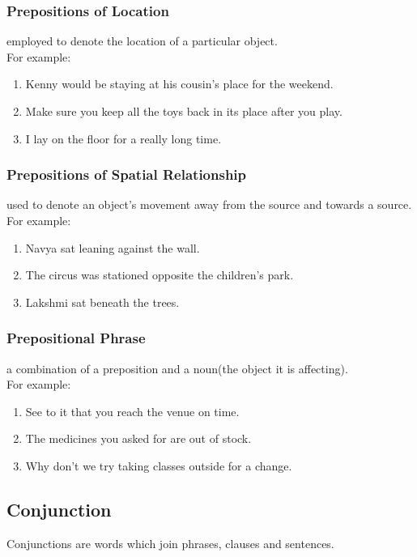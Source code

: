 \subsubsection{Prepositions of Location \cite{byjus-english-prepositions}}
employed to denote the location of a particular object.\\
For example:
\begin{enumerate}
    \item Kenny would be staying at his cousin’s place for the weekend.
    \item Make sure you keep all the toys back in its place after you play.
    \item I lay on the floor for a really long time.
\end{enumerate}

\subsubsection{Prepositions of Spatial Relationship \cite{byjus-english-prepositions}}
used to denote an object’s movement away from the source and towards a source.\\
For example:
\begin{enumerate}
    \item Navya sat leaning against the wall.
    \item The circus was stationed opposite the children’s park.
    \item Lakshmi sat beneath the trees.
\end{enumerate}

\subsubsection{Prepositional Phrase \cite{byjus-english-prepositions}} 
a combination of a preposition and a noun(the object it is affecting).\\
For example:
\begin{enumerate}
    \item See to it that you reach the venue on time.
    \item The medicines you asked for are out of stock.
    \item Why don’t we try taking classes outside for a change.
\end{enumerate}




\subsection{Conjunction \cite{wiki-Conjunction}}\label{Conjunction}
Conjunctions are words which join phrases, clauses and sentences.


